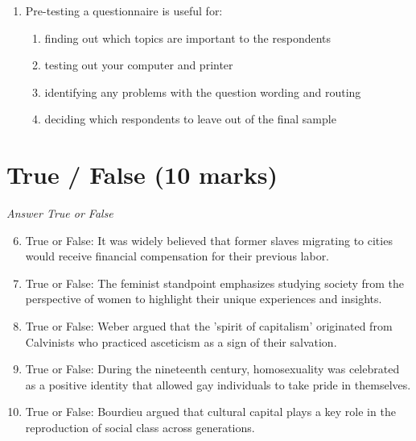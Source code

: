 \documentclass[12pt]{article}
\begin{document}
\begin{enumerate}[label=\arabic*.]
\begin{enumerate}[label=(\alph*)]
    \item it is committed on a larger, often global, scale, and is well organized
    \item it is associated with political conflict between states and their citizens
    \item it can have far-reaching effects upon international relations
    \item all of the above
\end{enumerate}
\item Pre-testing a questionnaire is useful for:
\begin{enumerate}[label=(\alph*)]
    \item finding out which topics are important to the respondents
    \item testing out your computer and printer
    \item identifying any problems with the question wording and routing
    \item deciding which respondents to leave out of the final sample
\end{enumerate}
\end{enumerate}

\section*{True / False (10 marks)}
\textit{Answer True or False}
\begin{enumerate}[label=\arabic*.]
\setcounter{enumi}{5}
\item True or False: It was widely believed that former slaves migrating to cities would receive financial compensation for their previous labor.
\item True or False: The feminist standpoint emphasizes studying society from the perspective of women to highlight their unique experiences and insights.
\item True or False: Weber argued that the 'spirit of capitalism' originated from Calvinists who practiced asceticism as a sign of their salvation.
\item True or False: During the nineteenth century, homosexuality was celebrated as a positive identity that allowed gay individuals to take pride in themselves.
\item True or False: Bourdieu argued that cultural capital plays a key role in the reproduction of social class across generations.
\end{enumerate}
\end{document}
